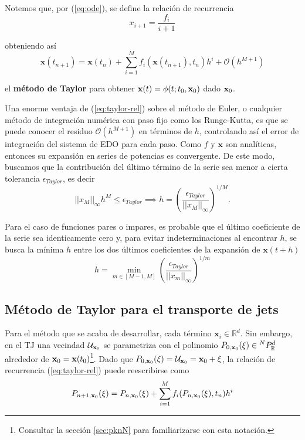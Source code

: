 Notemos que, por (\ref{eq:ode}), se define la relación de recurrencia
\begin{equation}
x_{i+1} = \frac{f_i}{i+1}
\label{eq:rec-rel}
\end{equation}

obteniendo así 
\begin{equation}
\mathbf{x}(t_{n+1}) = \mathbf{x}(t_n) + \sum_{i=1}^M f_i(\mathbf{x}(t_{n+1}),t_n)h^i + \mathcal{O}(h^{M+1})
\label{eq:taylor-rel}
\end{equation}

el \textbf{método de Taylor} para obtener $\mathbf{x}(t) = \phi(t;t_0,\mathbf{x}_0)$ dado $\mathbf{x}_0$.

Una enorme ventaja de (\ref{eq:taylor-rel}) sobre el método de Euler, o cualquier método de integración numérica con paso fijo como los Runge-Kutta, es que se puede conocer el residuo $\mathcal{O}(h^{M+1})$ en términos de $h$, controlando así el error de integración del sistema de EDO para cada paso. Como $f$ y $\mathbf{x}$ son analíticas, entonces su expansión en series de potencias es convergente. De este modo, buscamos que la contribución del último término de la serie sea menor a cierta tolerancia $\epsilon_{Taylor}$, es decir
\begin{equation*}
||x_M||_\infty h^M \leq \epsilon_{Taylor} \implies h = \left( \frac{\epsilon_{Taylor}}{||x_M||_\infty} \right)^{1/M}.
\end{equation*} 

Para el caso de funciones pares o impares, es probable que el último coeficiente de la serie sea identicamente cero y, para evitar indeterminaciones al encontrar $h$, se busca la mínima $h$ entre los dos últimos coeficientes de la expansión de $\mathbf{x}(t+h)$
\begin{equation}
h = \min_{m \in [M-1,M]}{ \left( \frac{\epsilon_{Taylor}}{||x_m||_\infty} \right)^{1/m} }
\label{eq:stepsize}
\end{equation} 

\subsection{Método de Taylor para el transporte de jets}
Para el método que se acaba de desarrollar, cada término $\mathbf{x}_i \in \mathbb{R}^d$. Sin embargo, en el TJ una vecindad $\mathcal{U}_{\mathbf{x}_0}$ se parametriza con el polinomio $P_{0,\mathbf{x}_0}(\mathbf{\xi}) \in {^{N}P_{\mathbb{R}}^ d }$ alrededor de $\mathbf{x}_0 = \mathbf{x}(t_0)$\footnote{Consultar la sección \ref{sec:pknN} para familiarizarse con esta notación.}. Dado que $P_{0,\mathbf{x}_0}(\mathbf{\xi}) = \mathcal{U}_{\mathbf{x}_0} = \mathbf{x}_0 + \mathbf{\xi}$, la relación de recurrencia (\ref{eq:taylor-rel}) puede reescribirse como
\begin{equation}
P_{n+1,\mathbf{x}_0}(\xi) = P_{n,\mathbf{x}_0}(\xi) + \sum_{i=1}^M f_i(P_{n,\mathbf{x}_0}(\xi),t_n)h^i 
\label{eq:jt-rel}
\end{equation}

